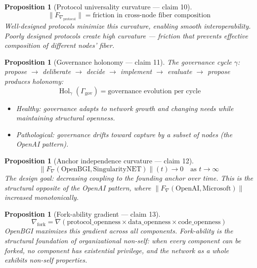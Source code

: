 \documentclass[11pt,a4paper]{article}
\newtheorem{proposition}[definition]{Proposition}
\begin{document}
\begin{proposition}[Protocol universality curvature --- claim 10]
\label{prop:protocol}
\[
  \|F_{\nabla_{\text{protocol}}}\| = \text{friction in cross-node
    fiber composition}
\]
Well-designed protocols minimize this curvature, enabling smooth
interoperability. Poorly designed protocols create high curvature ---
friction that prevents effective composition of different nodes' fiber.
\end{proposition}

\begin{proposition}[Governance holonomy --- claim 11]
\label{prop:holonomy}
The governance cycle $\gamma$: propose $\to$ deliberate $\to$ decide $\to$
implement $\to$ evaluate $\to$ propose produces holonomy:
\[
  \operatorname{Hol}_\gamma(\Gamma_{\text{gov}}) =
    \text{governance evolution per cycle}
\]
\begin{itemize}
  \item Healthy: governance adapts to network growth and changing needs
    while maintaining structural openness.
  \item Pathological: governance drifts toward capture by a subset of
    nodes (the OpenAI pattern).
\end{itemize}
\end{proposition}

\begin{proposition}[Anchor independence curvature --- claim 12]
\label{prop:anchor}
\[
  \|F_\nabla(\text{OpenBGI}, \text{SingularityNET})\|(t) \to 0
    \quad \text{as } t \to \infty
\]
The design goal: decreasing coupling to the founding anchor over time.
This is the structural opposite of the OpenAI pattern, where
$\|F_\nabla(\text{OpenAI}, \text{Microsoft})\|$ increased monotonically.
\end{proposition}

\begin{proposition}[Fork-ability gradient --- claim 13]
\label{prop:fork}
\[
  \nabla_{\text{fork}} = \nabla\left(\text{protocol\_openness} \times
    \text{data\_openness} \times \text{code\_openness}\right)
\]
OpenBGI maximizes this gradient across all components. Fork-ability is
the structural foundation of organizational non-self: when every
component can be forked, no component has existential privilege, and
the network as a whole exhibits non-self properties.
\end{proposition}
\end{document}
